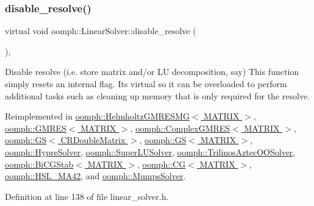 \subsubsection{\texorpdfstring{disable\+\_\+resolve()}{disable\_resolve()}}
{\footnotesize\ttfamily virtual void oomph\+::\+Linear\+Solver\+::disable\+\_\+resolve (\begin{DoxyParamCaption}{ }\end{DoxyParamCaption})\hspace{0.3cm}{\ttfamily [inline]}, {\ttfamily [virtual]}}



Disable resolve (i.\+e. store matrix and/or LU decomposition, say) This function simply resets an internal flag. It\textquotesingle{}s virtual so it can be overloaded to perform additional tasks such as cleaning up memory that is only required for the resolve. 



Reimplemented in \hyperlink{classoomph_1_1HelmholtzGMRESMG_a842b638722cd45650da8771aea2f9e5c}{oomph\+::\+Helmholtz\+G\+M\+R\+E\+S\+M\+G$<$ M\+A\+T\+R\+I\+X $>$}, \hyperlink{classoomph_1_1GMRES_a5297a6d4f978e601989990eee1333b64}{oomph\+::\+G\+M\+R\+E\+S$<$ M\+A\+T\+R\+I\+X $>$}, \hyperlink{classoomph_1_1ComplexGMRES_a07db774f0aca4e71579c7c071e25a451}{oomph\+::\+Complex\+G\+M\+R\+E\+S$<$ M\+A\+T\+R\+I\+X $>$}, \hyperlink{classoomph_1_1GS_3_01CRDoubleMatrix_01_4_a41c2dd2610f61fd9e25053511fdd9eab}{oomph\+::\+G\+S$<$ C\+R\+Double\+Matrix $>$}, \hyperlink{classoomph_1_1GS_a9c3bfbebb6686c5f3ca650ef01697728}{oomph\+::\+G\+S$<$ M\+A\+T\+R\+I\+X $>$}, \hyperlink{classoomph_1_1HypreSolver_ae8949856fc75ff767f1ad940a710109f}{oomph\+::\+Hypre\+Solver}, \hyperlink{classoomph_1_1SuperLUSolver_ac278643faf0a13eb3f8e6bc984338d2a}{oomph\+::\+Super\+L\+U\+Solver}, \hyperlink{classoomph_1_1TrilinosAztecOOSolver_a7d9c9d9beddb2d18abea55529db534e4}{oomph\+::\+Trilinos\+Aztec\+O\+O\+Solver}, \hyperlink{classoomph_1_1BiCGStab_a7ed3198928966fddf84e9f908b3361d4}{oomph\+::\+Bi\+C\+G\+Stab$<$ M\+A\+T\+R\+I\+X $>$}, \hyperlink{classoomph_1_1CG_a1116011340fabc5c5d2a97cea0cd5b72}{oomph\+::\+C\+G$<$ M\+A\+T\+R\+I\+X $>$}, \hyperlink{classoomph_1_1HSL__MA42_a8419d983544da158f96ab305549a94a9}{oomph\+::\+H\+S\+L\+\_\+\+M\+A42}, and \hyperlink{classoomph_1_1MumpsSolver_aba2b1c844e190da45c8adbd6dfc0f344}{oomph\+::\+Mumps\+Solver}.



Definition at line 138 of file linear\+\_\+solver.\+h.



